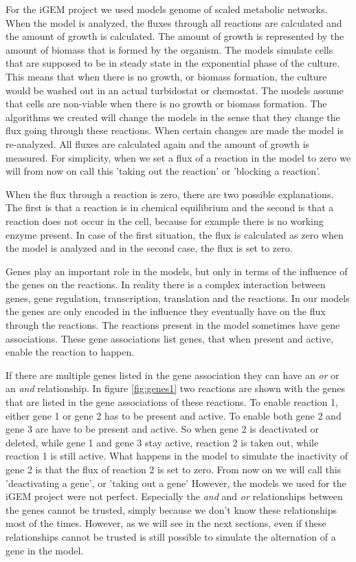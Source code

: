 \documentclass[12pt]{report}
\begin{document}
For the iGEM project we used models genome of scaled metabolic networks. When the model is analyzed, the fluxes through all reactions are calculated and the amount of growth is calculated. The amount of growth is represented by the amount of biomass that is formed by the organism. The models simulate cells that are supposed to be in steady state in the exponential phase of the culture. This means that when there is no growth, or biomass formation, the culture would be washed out in an actual turbidostat or chemostat. The models assume that cells are non-viable when there is no growth or biomass formation. The algorithms we created will change the models in the sense that they change the flux going through these reactions. When certain changes are made the model is re-analyzed. All fluxes are calculated again and the amount of growth is measured. For simplicity, when we set a flux of a reaction in the model to zero we will from now on call this 'taking out the reaction' or 'blocking a reaction'.

When the flux through a reaction is zero, there are two possible explanations. The first is that a reaction is in chemical equilibrium and the second is that a reaction does not occur in the cell, because for example there is no working enzyme present. In case of the first situation, the flux is calculated as zero when the model is analyzed and in the second case, the flux is set to zero.

Genes play an important role in the models, but only in terms of the influence of the genes on the reactions.
In reality there is a complex interaction between genes, gene regulation, transcription, translation and the reactions.
In our models the genes are only encoded in the influence they eventually have on the flux through the reactions.
The reactions present in the model sometimes have gene associations.
These gene associations list genes, that when present and active, enable the reaction to happen.

If there are multiple genes listed in the gene association they can have an \emph{or} or an \emph{and} relationship.
In figure \ref{fig:genes1}  two reactions are shown with the genes that are listed in the gene associations of these reactions.
To enable reaction 1, either gene 1 or gene 2 has to be present and active. To enable both gene 2 and gene 3 are have to be present and active. So when gene 2 is deactivated or deleted, while gene 1 and gene 3 stay active, reaction 2 is taken out, while reaction 1 is still active. What happens in the model to simulate the inactivity of gene 2 is that the flux of reaction 2 is set to zero. From now on we will call this 'deactivating a gene', or 'taking out a gene'
However, the models we used for the iGEM project were not perfect. Especially the \emph{and} and \emph{or} relationships between the genes cannot be trusted, simply because we don't know these relationships most of the times.
However, as we will see in the next sections, even if these relationships cannot be trusted is still possible to simulate the alternation of a gene in the model.
\end{document}
